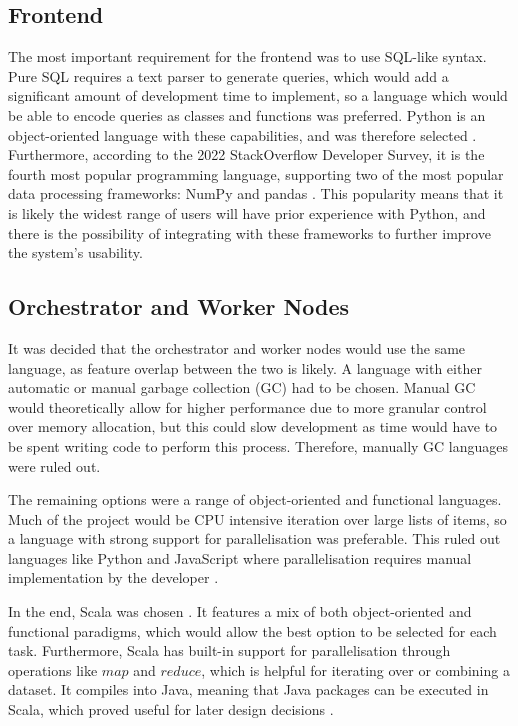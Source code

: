 \subsection{Frontend}\label{subsec:frontend-design}
The most important requirement for the frontend was to use SQL-like syntax. Pure SQL requires a text parser to generate queries, which would add a significant amount of development time to implement, so a language which would be able to encode queries as classes and functions was preferred. Python is an object-oriented language with these capabilities, and was therefore selected \cite{python3-10}. Furthermore, according to the 2022 StackOverflow Developer Survey, it is the fourth most popular programming language, supporting two of the most popular data processing frameworks: NumPy and pandas \cite{stackoverflowsurvey2022, reback2020pandas, harris2020array}. This popularity means that it is likely the widest range of users will have prior experience with Python, and there is the possibility of integrating with these frameworks to further improve the system's usability. 

\subsection{Orchestrator and Worker Nodes}
It was decided that the orchestrator and worker nodes would use the same language, as feature overlap between the two is likely. A language with either automatic or manual garbage collection (GC) had to be chosen. Manual GC would theoretically allow for higher performance due to more granular control over memory allocation, but this could slow development as time would have to be spent writing code to perform this process. Therefore, manually GC languages were ruled out.

The remaining options were a range of object-oriented and functional languages. Much of the project would be CPU intensive iteration over large lists of items, so a language with strong support for parallelisation was preferable. This ruled out languages like Python and JavaScript where parallelisation requires manual implementation by the developer \cite{pythonmultiprocessing, nodeworkerthreads}.

In the end, Scala was chosen \cite{scaladocs}. It features a mix of both object-oriented and functional paradigms, which would allow the best option to be selected for each task. Furthermore, Scala has built-in support for parallelisation through operations like $map$ and $reduce$, which is  helpful for iterating over or combining a dataset. It compiles into Java, meaning that Java packages can be executed in Scala, which proved useful for later design decisions \cite{scalaforjavadevs}.
 
